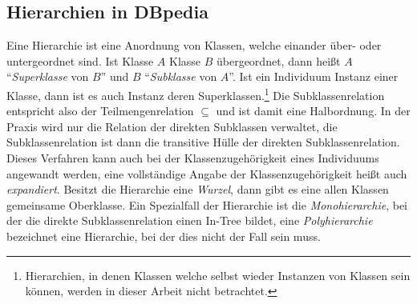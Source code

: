 \subsection{Hierarchien in DBpedia}\label{sec:grundlagen-hierarchien}
Eine Hierarchie ist eine Anordnung von Klassen, welche einander über- oder untergeordnet sind.
Ist Klasse $A$ Klasse $B$ übergeordnet, dann heißt $A$ "`\emph{Superklasse} von $B$"' und $B$ "`\emph{Subklasse} von $A$"'.
Ist ein Individuum Instanz einer Klasse, dann ist es auch Instanz deren Superklassen.\footnote{Hierarchien, in denen Klassen welche selbst wieder Instanzen von Klassen sein können, werden in dieser Arbeit nicht betrachtet.}
Die Subklassenrelation entspricht also der Teilmengenrelation $\subseteq$ und ist damit eine Halbordnung.
In der Praxis wird nur die Relation der direkten Subklassen verwaltet, die Subklassenrelation ist dann die transitive Hülle der direkten Subklassenrelation.
Dieses Verfahren kann auch bei der Klassenzugehörigkeit eines Individuums angewandt werden, eine vollständige Angabe der Klassenzugehörigkeit heißt auch \emph{expandiert}.
Besitzt die Hierarchie eine \emph{Wurzel}, dann gibt es eine allen Klassen gemeinsame Oberklasse.%
Ein Spezialfall der Hierarchie ist die \emph{Monohierarchie}, bei der die direkte Subklassenrelation einen In-Tree bildet,
eine \emph{Polyhierarchie} bezeichnet eine Hierarchie, bei der dies nicht der Fall sein muss.%


